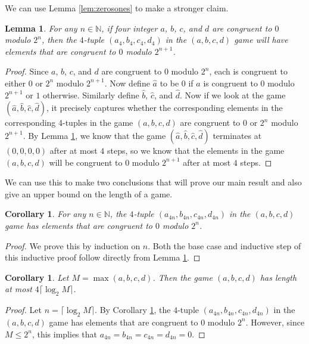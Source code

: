 \documentclass[12pt]{amsart}
\newtheorem{corollary}[theorem]{Corollary}
\newtheorem{lemma}[theorem]{Lemma}
\newcommand{\znn}{\mathbb{N}}
\begin{document}
We can use Lemma \ref{lem:zerosones} to make a stronger claim.

\begin{lemma}
For any $n \in \znn$, if four integer $a$, $b$, $c$, and $d$ are congruent to $0$ modulo $2^n$, then the $4$-tuple $(a_4, b_4, c_4, d_4)$ in the $(a,b,c,d)$ game will have elements that are congruent to $0$ modulo $2^{n+1}$.
\label{lem:evenodd}
\end{lemma}

\begin{proof}
Since $a$, $b$, $c$, and $d$ are congruent to $0$ modulo $2^n$, each is congruent to either $0$ or $2^n$ modulo $2^{n+1}$. Now define $\hat{a}$ to be $0$ if $a$ is congruent to $0$ modulo $2^{n+1}$ or $1$ otherwise. Similarly define $\hat{b}$, $\hat{c}$, and $\hat{d}$. Now if we look at the game $(\hat{a},\hat{b},\hat{c},\hat{d})$, it precisely captures whether the corresponding elements in the corresponding 4-tuples in the game $(a,b,c,d)$ are congruent to $0$ or $2^n$ modulo $2^{n+1}$. By Lemma \ref{lem:evenodd}, we know that the game $(\hat{a},\hat{b},\hat{c},\hat{d})$ terminates at $(0,0,0,0)$ after at most $4$ steps, so we know that the elements in the game $(a,b,c,d)$ will be congruent to $0$ modulo $2^{n+1}$ after at most $4$ steps.
\end{proof}

We can use this to make two conclusions that will prove our main result and also give an upper bound on the length of a game.

\begin{corollary}
For any $n \in \znn$, the $4$-tuple $(a_{4n}, b_{4n}, c_{4n}, d_{4n})$ in the $(a,b,c,d)$ game has elements that are congruent to $0$ modulo $2^n$.
\label{cor:pow2}
\end{corollary}

\begin{proof}
We prove this by induction on $n$.
Both the base case and inductive step of this inductive proof follow directly from Lemma \ref{lem:evenodd}.
\end{proof}

\begin{corollary}
Let $M=\max(a,b,c,d)$. Then the game $(a,b,c,d)$ has length at most $4\lceil\log_2{M}\rceil$.
\end{corollary}

\begin{proof}
Let $n = \lceil\log_2{M}\rceil$. By Corollary \ref {cor:pow2}, the $4$-tuple $(a_{4n}, b_{4n}, c_{4n}, d_{4n})$ in the $(a,b,c,d)$ game has elements that are congruent to $0$ modulo $2^n$. However, since $M\leq2^n$, this implies that $a_{4n}=b_{4n}=c_{4n}=d_{4n}=0$.
\end{proof}
\end{document}
